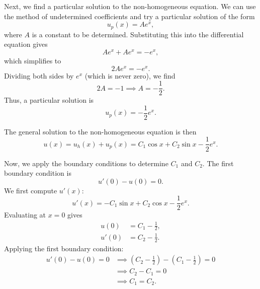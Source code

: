 \documentclass{article}
\begin{document}
\begin{enumerate}[(a)]
        Next, we find a particular solution to the non-homogeneous equation. We can use the method of undetermined coefficients and try a particular solution of the form
        \begin{equation*}
          u_p(x) = Ae^x,
        \end{equation*}
        where $A$ is a constant to be determined. Substituting this into the differential equation gives
        \begin{equation*}
          A e^x + A e^x = -e^x,
        \end{equation*}
        which simplifies to
        \begin{equation*}
          2A e^x = -e^x.
        \end{equation*}
        Dividing both sides by $e^x$ (which is never zero), we find
        \begin{equation*}
          2A = -1 \implies A = -\frac{1}{2}.
        \end{equation*}
        Thus, a particular solution is
        \begin{equation*}
          u_p(x) = -\frac{1}{2} e^x.
        \end{equation*}

        The general solution to the non-homogeneous equation is then
        \begin{equation*}
          u(x) = u_h(x) + u_p(x) = C_1 \cos x + C_2 \sin x - \frac{1}{2} e^x.
        \end{equation*}

        Now, we apply the boundary conditions to determine $C_1$ and $C_2$. The first boundary condition is
        \begin{equation*}
          u'(0) - u(0) = 0.
        \end{equation*}
        We first compute $u'(x)$:
        \begin{equation*}
          u'(x) = -C_1 \sin x + C_2 \cos x - \frac{1}{2} e^x.
        \end{equation*}
        Evaluating at $x = 0$ gives
        \begin{align*}
          u(0) & = C_1 - \frac{1}{2}, \\
          u'(0) & = C_2 - \frac{1}{2}.
        \end{align*}
        Applying the first boundary condition:
        \begin{align*}
        u'(0) - u(0) = 0 &\implies (C_2 - \tfrac{1}{2}) - (C_1 - \tfrac{1}{2}) = 0 \\
                 &\implies C_2 - C_1 = 0 \\
                 &\implies C_1 = C_2.
        \end{align*}


\end{enumerate}
\end{document}

